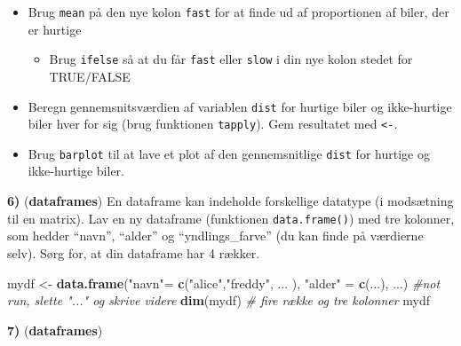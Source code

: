 \documentclass[
]{book}
\newenvironment{Shaded}{\begin{snugshade}}{\end{snugshade}}
\newcommand{\CommentTok}[1]{\textcolor[rgb]{0.37,0.37,0.37}{\textit{#1}}}
\newcommand{\DecValTok}[1]{\textcolor[rgb]{0.06,0.06,0.06}{#1}}
\newcommand{\FunctionTok}[1]{\textcolor[rgb]{0.27,0.27,0.27}{\textbf{#1}}}
\newcommand{\NormalTok}[1]{#1}
\newcommand{\OtherTok}[1]{\textcolor[rgb]{0.37,0.37,0.37}{#1}}
\newcommand{\SpecialCharTok}[1]{\textcolor[rgb]{0.43,0.43,0.43}{\textbf{#1}}}
\newcommand{\StringTok}[1]{\textcolor[rgb]{0.5,0.5,0.5}{#1}}
\providecommand{\tightlist}{%
  \setlength{\itemsep}{0pt}\setlength{\parskip}{0pt}}
\begin{document}
\begin{Shaded}
\end{Shaded}

\begin{itemize}
\tightlist
\item
  Brug \texttt{mean} på den nye kolon \texttt{fast} for at finde ud af proportionen af biler, der er hurtige

  \begin{itemize}
  \tightlist
  \item
    Brug \texttt{ifelse} så at du får \texttt{fast} eller \texttt{slow} i din nye kolon stedet for TRUE/FALSE
  \end{itemize}
\item
  Beregn gennemsnitsværdien af variablen \texttt{dist} for hurtige biler og ikke-hurtige biler hver for sig (brug funktionen \texttt{tapply}). Gem resultatet med \texttt{\textless{}-}.
\item
  Brug \texttt{barplot} til at lave et plot af den gennemsnitlige \texttt{dist} for hurtige og ikke-hurtige biler.
\end{itemize}

\textbf{6)} (\textbf{dataframes}) En dataframe kan indeholde forskellige datatype (i modsætning til en matrix). Lav en ny dataframe (funktionen \texttt{data.frame()}) med tre kolonner, som hedder ``navn'', ``alder'' og ``yndlings\_farve'' (du kan finde på værdierne selv). Sørg for, at din dataframe har 4 rækker.

\begin{Shaded}
\begin{Highlighting}[]
\NormalTok{mydf }\OtherTok{\textless{}{-}} \FunctionTok{data.frame}\NormalTok{(}\StringTok{"navn"}\OtherTok{=} \FunctionTok{c}\NormalTok{(}\StringTok{"alice"}\NormalTok{,}\StringTok{"freddy"}\NormalTok{, ... ), }\StringTok{"alder"} \OtherTok{=} \FunctionTok{c}\NormalTok{(...), ...) }\CommentTok{\#not run, slette "..." og skrive videre}
\FunctionTok{dim}\NormalTok{(mydf) }\CommentTok{\# fire række og tre kolonner}
\NormalTok{mydf}
\end{Highlighting}
\end{Shaded}

\textbf{7)} (\textbf{dataframes})
\end{document}
